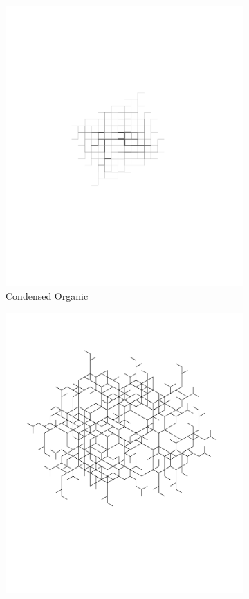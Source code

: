 \documentclass[12pt,twoside]{reedthesis}
\begin{document}
\begin{figure}[h]
\begin{subfigure}{0.5\textwidth}
		\includegraphics[clip=true, viewport=2.5in 4in 8.5in 8.5in, height = 0.9\textwidth]{Images/HowToExplore5B}
		\caption{Condensed Organic\footnotemark}
		\label {HowToExplore5B}
	\end{subfigure}
	\begin{subfigure}{0.5\textwidth}
		\centering
		\includegraphics[clip=true, viewport=0.8in 3in 9in 11in, height = 0.9\textwidth]{Images/HowToExplore5C}

\end{subfigure}
\end{figure}
\end{document}
